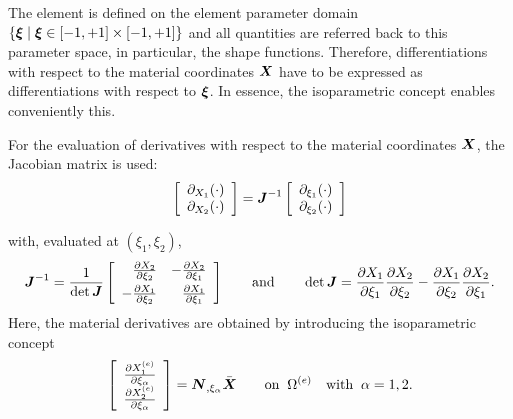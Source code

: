 The element is defined on the element parameter domain
$\{\boldsymbol{\xi} \;|\; \boldsymbol{\xi} \in  [-1,+1]\times[-1,+1]\}$ and all
quantities are referred back to this parameter space, in particular, the shape
functions. Therefore, differentiations with respect to the material
coordinates $\boldsymbol{X}$ have to be expressed as differentiations with respect to
$\boldsymbol{\xi}$. In essence, the isoparametric concept enables conveniently this.

For the evaluation of derivatives with respect to the material coordinates
$\boldsymbol{X}$, the Jacobian matrix is used:\\
\begin{equation}
  \left[ \begin{array} {r} \partial_{X_{1}} (\cdot) \\ \partial_{X_{2}} (\cdot) \end{array}
  \right ] = \boldsymbol{J}^{-1} \left [ \begin{array} {c} \partial_{\xi_1} (\cdot) \\
  \partial_{\xi_2} (\cdot) \end{array} \right ]
\end{equation}

with, evaluated at $(\xi_1,\xi_2)$,
\begin{equation}
  \boldsymbol{J}^{-1} 
  = \frac{1}{\det \boldsymbol{J}} \left [ \begin{array}
  {rr}  \frac{\partial X_{2}}{\partial \xi_2} & - \frac{\partial
  X_{2}}{\partial \xi_1} \\[1ex] - \frac{\partial X_{1}}{\partial \xi_2} &
  \frac{\partial X_{1}}{\partial \xi_1} \end{array} \right ]
  \qquad\text{and}\qquad
  \det \boldsymbol{J} =
  \frac{\partial X_{1}}{\partial \xi_1} \frac{\partial X_{2}}{\partial \xi_2} -
  \frac{\partial X_{1}}{\partial \xi_2} \frac{\partial X_{2}}{\partial \xi_1} 
  \text{.}
\end{equation}
Here, the material derivatives are obtained by introducing the isoparametric
concept\\
\begin{equation}
  \left[\begin{array}{c} 
      \frac{\partial X_1^{(e)}}{\partial \xi_\alpha} \\ \frac{\partial X_2^{(e)}}{\partial \xi_\alpha}
  \end{array}\right]
  = \boldsymbol{N}_{,\xi_\alpha} \bar{\boldsymbol{X}}
  \qquad\text{on}\;\;\Omega^{(e)}\quad\text{with}\;\;\alpha=1,2
  \text{.}
\end{equation}

